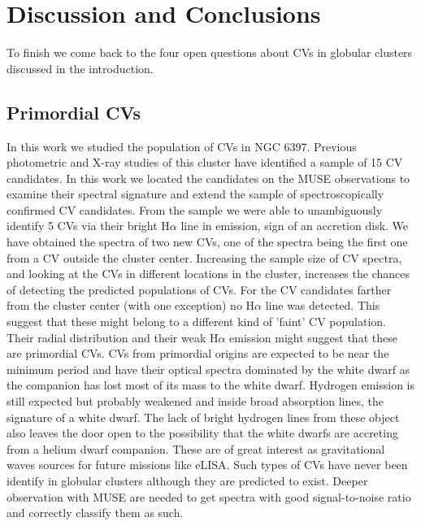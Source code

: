 \chapter{Discussion and Conclusions}\label{chap:conclu}
\thispagestyle{fancy}

To finish we come back to the four open questions about CVs in globular clusters discussed in the introduction. 


\section{Primordial CVs}

In this work we studied the population of CVs in NGC 6397. Previous photometric and X-ray studies of this cluster have identified a sample of 15 CV candidates. In this work we located the candidates on the MUSE observations to examine their spectral signature and extend the sample of spectroscopically confirmed CV candidates. From the sample we were able to unambiguously identify 5 CVs via their bright H$\alpha$ line in emission, sign of an accretion disk. We have obtained the spectra of two new CVs, one of the spectra being the first one from a CV outside the cluster center. Increasing the sample size of CV spectra, and looking at the CVs in different locations in the cluster, increases the chances of detecting the predicted populations of CVs. For the CV candidates farther from the cluster center (with one exception) no H$\alpha$ line was detected. This suggest that these might belong to a different kind of 'faint' CV population. Their radial distribution and their weak H$\alpha$ emission might suggest that these are primordial CVs. CVs from primordial origins are expected to be near the minimum period and have their optical spectra dominated by the white dwarf as the companion has lost most of its mass to the white dwarf. Hydrogen emission is still expected but probably weakened and inside broad absorption lines, the signature of a white dwarf. The lack of bright hydrogen lines from these object also leaves the door open to the possibility that the white dwarfs are accreting from a helium dwarf companion. These are of great interest as gravitational waves sources for future missions like eLISA. Such types of CVs have never been identify in globular clusters although they are predicted to exist. Deeper observation with MUSE are needed to get spectra with good signal-to-noise ratio and correctly classify them as such. 

